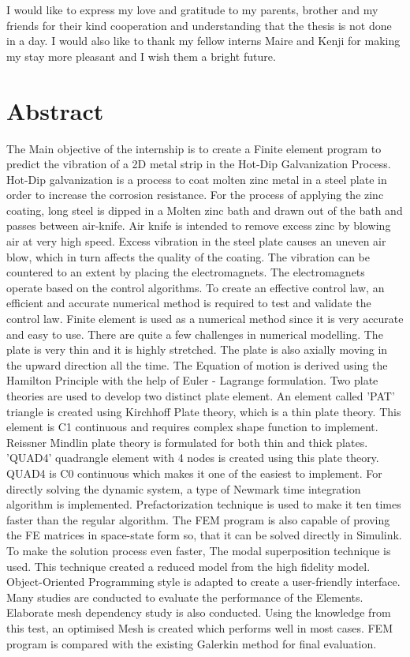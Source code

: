 \documentclass[12pt,twoside]{report}
\begin{document}
I would like to express my love and gratitude to my parents, brother and my friends for their kind cooperation and understanding that the thesis is not done in a day. I would also like to thank my fellow interns Maire and Kenji for making my stay more pleasant and I wish them a bright future. 
 



\chapter*{Abstract}

The Main objective of the internship is to create a Finite element program to predict the vibration of a 2D metal strip in the Hot-Dip Galvanization Process. Hot-Dip galvanization is a process to coat molten zinc metal in a steel plate in order to increase the corrosion resistance. For the process of applying the zinc coating, long steel is dipped in a Molten zinc bath and drawn out of the bath and passes between air-knife. Air knife is intended to remove excess zinc by blowing air at very high speed. Excess vibration in the steel plate causes an uneven air blow, which in turn affects the quality of the coating. The vibration can be countered to an extent by placing the electromagnets. The electromagnets operate based on the control algorithms. To create an effective control law, an efficient and accurate numerical method is required to test and validate the control law. Finite element is used as a numerical method since it is very accurate and easy to use. There are quite a few challenges in numerical modelling. The plate is very thin and it is highly stretched. The plate is also axially moving in the upward direction all the time. The Equation of motion is derived using the Hamilton Principle with the help of Euler - Lagrange formulation. Two plate theories are used to develop two distinct plate element. An element called 'PAT' triangle is created using Kirchhoff Plate theory, which is a thin plate theory. This element is C1 continuous and requires complex shape function to implement. Reissner Mindlin plate theory is formulated for both thin and thick plates. 'QUAD4' quadrangle element with 4 nodes is created using this plate theory. QUAD4 is C0 continuous which makes it one of the easiest to implement. For directly solving the dynamic system, a type of Newmark time integration algorithm is implemented.  Prefactorization technique is used to make it ten times faster than the regular algorithm. The FEM program is also capable of proving the FE matrices in space-state form so, that it can be solved directly in Simulink. To make the solution process even faster, The modal superposition technique is used. This technique created a reduced model from the high fidelity model. Object-Oriented Programming style is adapted to create a user-friendly interface. Many studies are conducted to evaluate the performance of the Elements. Elaborate mesh dependency study is also conducted.  Using the knowledge from this test, an optimised Mesh is created which performs well in most cases. FEM program is compared with the existing Galerkin method for final evaluation.
\end{document}

